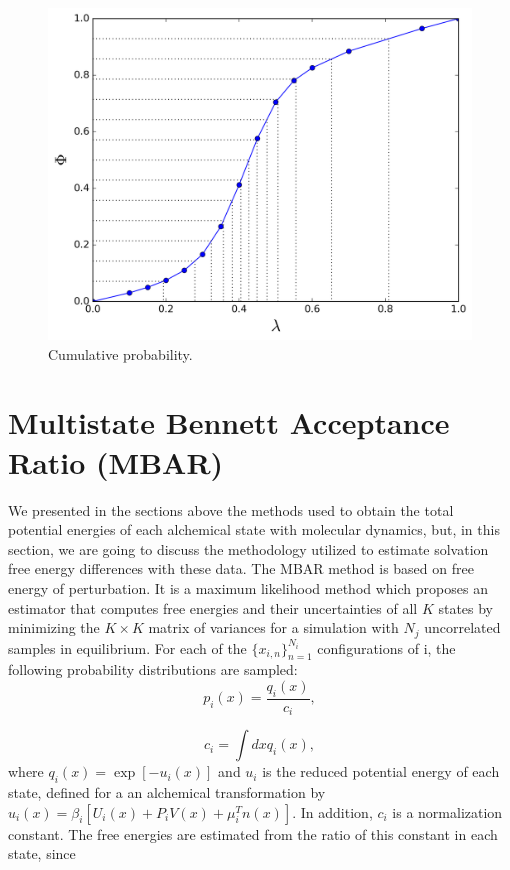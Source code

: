     \begin{figure}[h]
    	\centering
    	\includegraphics[width=0.8\linewidth]{Figures/optimized_cdfexeample}
    	\caption{Cumulative probability.}
    	\label{fig:optimized_cdfexeample}
    \end{figure}

\section{Multistate Bennett Acceptance Ratio (MBAR)}\label{mbar}

We presented in the sections above the methods used to obtain the total potential energies of each alchemical state with molecular dynamics, but, in this section, we are going to discuss the methodology utilized to estimate solvation free energy differences with these data. The MBAR method \cite{mbar} is based on free energy of perturbation. It is a maximum likelihood method which proposes an estimator that computes free energies and their uncertainties of all $K$ states by minimizing the $K \times K$ matrix of variances for a simulation with $N_{j}$ uncorrelated samples in equilibrium. For each of the $\lbrace x_{i,n } \rbrace ^{N_{i}}_{n=1 }$ configurations of i, the following probability distributions are sampled:
\begin{equation}
p_{i}(x) = \frac{q_{i}(x)}{c_{i}},
\end{equation}

\begin{equation}
c_{i} = \int dx q_{i}(x),
\end{equation}
where $q_{i}(x)=\exp[-u_{i}(x)]$ and $u_{i}$ is the reduced potential energy of each state, defined for a an alchemical transformation by $u_{i} (x)= \beta_{i} [U_{i}(x)+P_{i}V(x) + \mu _{i}^{T}n(x)]$. In addition, $c_{i}$ is a normalization constant.  The free energies are estimated from the ratio of this constant in each state, since

